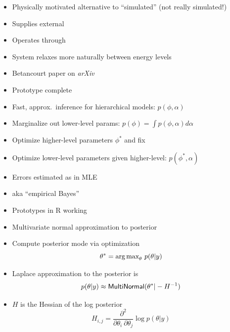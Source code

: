 \documentclass[10pt]{report}
\begin{document}
%
\begin{itemize}
\item Physically motivated alternative to ``simulated''
   (not really simulated!)
\item Supplies external 
\item Operates through 
\item System relaxes more naturally between energy levels
\item Betancourt paper on {\slshape arXiv}
  \vfill
\item Prototype complete
\end{itemize}


%
\begin{itemize}
\item Fast, approx.\ inference for hierarchical models: $p(\phi, \alpha)$
\item Marginalize out lower-level params: $p(\phi) = \int p(\phi, \alpha) d\alpha$
\item Optimize higher-level parameters $\phi^*$ and fix
\item Optimize lower-level parameters given higher-level: $p(\phi^*, \alpha)$
\item Errors estimated as in MLE
\item aka ``empirical Bayes''
\item Prototypes in R working
\end{itemize}


%
\begin{itemize}
\item Multivariate normal approximation to posterior
\item Compute posterior mode via optimization
\[
\theta^{*} = \mbox{arg\,max}_{\theta} \  p(\theta | y) 
\]
\item Laplace approximation to the posterior is
\[
p(\theta | y) 
\approx 
\text{\sf MultiNormal}(\theta^{*} | -H^{-1})
\]
\item $H$ is the Hessian of the log posterior
\[
H_{i,j} 
= \frac{\partial^2}{\partial \theta_i \ \partial \theta_j}
  \log p(\theta | y)
\]
\end{itemize}
\end{document}
